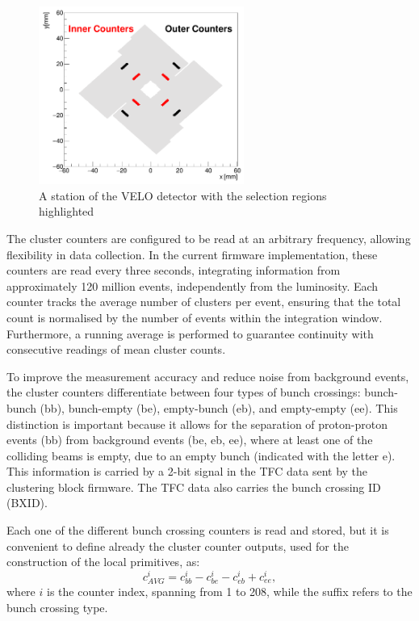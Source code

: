 \begin{figure}
    \centering
    \includegraphics[width=0.6\textwidth]{figures/counters.png}
    \caption{A station of the VELO detector with the selection regions highlighted}
    \label{fig:VELO-counters}
\end{figure}

The cluster counters are configured to be read at an arbitrary frequency, allowing flexibility in data collection. In the current firmware implementation, these counters are read every three seconds, integrating information from approximately 120 million events, independently from the luminosity. 
Each counter tracks the average number of clusters per event, ensuring that the total count is normalised by the number of events within the integration window. Furthermore, a running average is performed to guarantee continuity with consecutive readings of mean cluster counts.

To improve the measurement accuracy and reduce noise from background events, the cluster counters differentiate between four types of bunch crossings: bunch-bunch (bb), bunch-empty (be), empty-bunch (eb), and empty-empty (ee). This distinction is important because it allows for the separation of proton-proton events (bb) from background events (be, eb, ee), where at least one of the colliding beams is empty, due to an empty bunch (indicated with the letter e). This information is carried by a 2-bit signal in the TFC data sent by the clustering block firmware. The TFC data also carries the bunch crossing ID (BXID).

Each one of the different bunch crossing counters is read and stored, but it is convenient to define already the cluster counter outputs, used for the construction of the local primitives, as: 
\begin{equation}
    c^i_{AVG} = c^i_{bb} - c^i_{be} - c^i_{eb} + c^i_{ee},
\end{equation}
where $i$ is the counter index, spanning from 1 to 208, while the suffix refers to the bunch crossing type.

